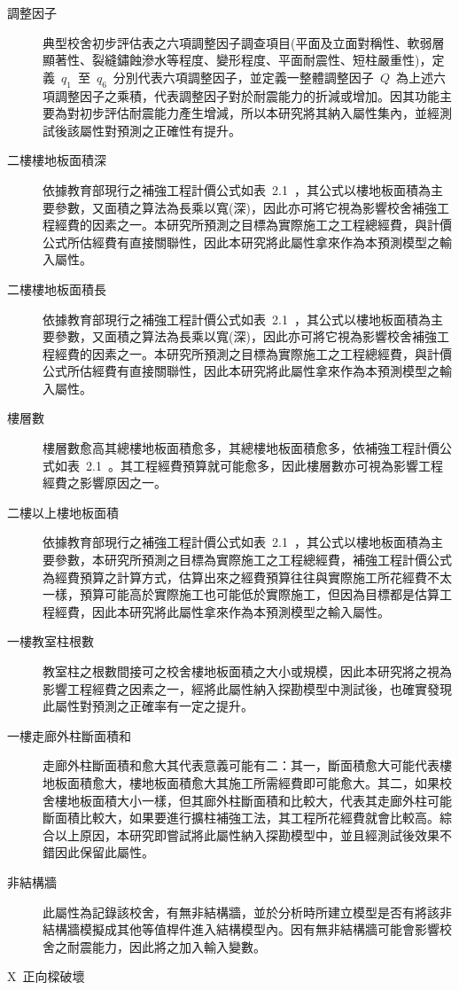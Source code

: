 \begin{description}
  \item[調整因子]
  典型校舍初步評估表之六項調整因子調查項目(平面及立面對稱性、軟弱層顯著性、裂縫鏽蝕滲水等程度、變形程度、平面耐震性、短柱嚴重性)，定義~$q_1$~至~$q_6$~分別代表六項調整因子，並定義一整體調整因子~$Q$~為上述六項調整因子之乘積，代表調整因子對於耐震能力的折減或增加。因其功能主要為對初步評估耐震能力產生增減，所以本研究將其納入屬性集內，並經測試後該屬性對預測之正確性有提升。
  \item[二樓樓地板面積深]
  依據教育部現行之補強工程計價公式如表~2.1~，其公式以樓地板面積為主要參數，又面積之算法為長乘以寬(深)，因此亦可將它視為影響校舍補強工程經費的因素之一。本研究所預測之目標為實際施工之工程總經費，與計價公式所估經費有直接關聯性，因此本研究將此屬性拿來作為本預測模型之輸入屬性。
  \item[二樓樓地板面積長]
  依據教育部現行之補強工程計價公式如表~2.1~，其公式以樓地板面積為主要參數，又面積之算法為長乘以寬(深)，因此亦可將它視為影響校舍補強工程經費的因素之一。本研究所預測之目標為實際施工之工程總經費，與計價公式所估經費有直接關聯性，因此本研究將此屬性拿來作為本預測模型之輸入屬性。
  \item[樓層數]
  樓層數愈高其總樓地板面積愈多，其總樓地板面積愈多，依補強工程計價公式如表~2.1~。其工程經費預算就可能愈多，因此樓層數亦可視為影響工程經費之影響原因之一。
  \item[二樓以上樓地板面積]
  依據教育部現行之補強工程計價公式如表~2.1~，其公式以樓地板面積為主要參數，本研究所預測之目標為實際施工之工程總經費，補強工程計價公式為經費預算之計算方式，估算出來之經費預算往往與實際施工所花經費不太一樣，預算可能高於實際施工也可能低於實際施工，但因為目標都是估算工程經費，因此本研究將此屬性拿來作為本預測模型之輸入屬性。
  \item[一樓教室柱根數]
  教室柱之根數間接可之校舍樓地板面積之大小或規模，因此本研究將之視為影響工程經費之因素之一，經將此屬性納入探勘模型中測試後，也確實發現此屬性對預測之正確率有一定之提升。
  \item[一樓走廊外柱斷面積和]
  走廊外柱斷面積和愈大其代表意義可能有二：其一，斷面積愈大可能代表樓地板面積愈大，樓地板面積愈大其施工所需經費即可能愈大。其二，如果校舍樓地板面積大小一樣，但其廊外柱斷面積和比較大，代表其走廊外柱可能斷面積比較大，如果要進行擴柱補強工法，其工程所花經費就會比較高。綜合以上原因，本研究即嘗試將此屬性納入探勘模型中，並且經測試後效果不錯因此保留此屬性。
  \item[非結構牆]
  此屬性為記錄該校舍，有無非結構牆，並於分析時所建立模型是否有將該非結構牆模擬成其他等值桿件進入結構模型內。因有無非結構牆可能會影響校舍之耐震能力，因此將之加入輸入變數。
  \item[X~正向樑破壞]

\end{description}
